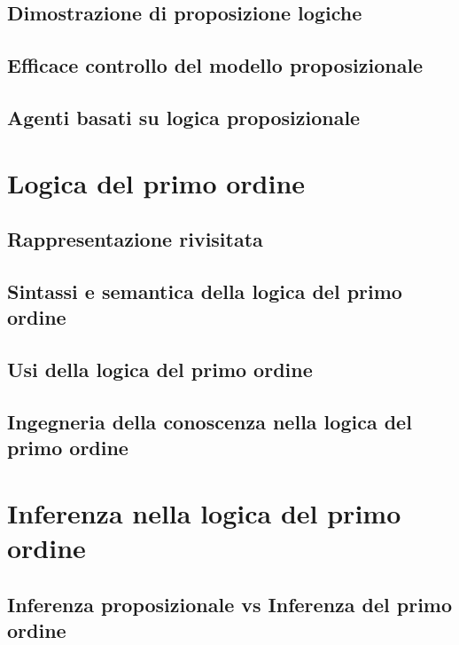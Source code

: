 \documentclass[a4paper]{extarticle}
\begin{document}
\subsection{Dimostrazione di proposizione logiche}

\subsection{Efficace controllo del modello proposizionale}

\subsection{Agenti basati su logica proposizionale}

\newpage

\section{Logica del primo ordine}

\subsection{Rappresentazione rivisitata}

\subsection{Sintassi e semantica della logica del primo ordine}

\subsection{Usi della logica del primo ordine}

\subsection{Ingegneria della conoscenza nella logica del primo ordine}

\newpage

\section{Inferenza nella logica del primo ordine}

\subsection{Inferenza proposizionale vs Inferenza del primo ordine}
\end{document}
